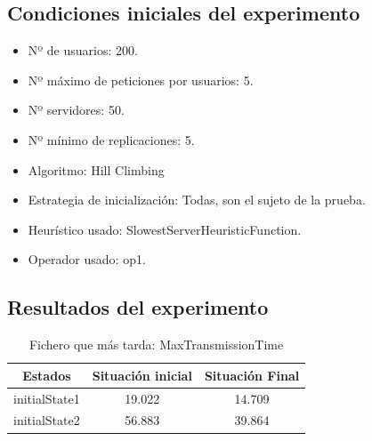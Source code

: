 \documentclass[a4paper,10pt]{report}
\begin{document}
		\subsection*{Condiciones iniciales del experimento}
		\begin{itemize}
		    \item Nº de usuarios: 200.
    		\item Nº máximo de peticiones por usuarios: 5.
    		\item Nº servidores: 50.
    		\item Nº mínimo de replicaciones: 5.
    		\item Algoritmo: Hill Climbing
    		\item Estrategia de inicialización: Todas, son el sujeto de la prueba. 
    		\item Heurístico usado: SlowestServerHeuristicFunction.
    		\item Operador usado: op1.
		\end{itemize}

		\subsection*{Resultados del experimento}
		\begin{table}[H]
		\centering
        \begin{tabular}{c|c|c}
            Estados & Situación inicial & Situación Final \\
            \hline
            \hline
            initialState1 & 19.022 & 14.709 \\
            \hline
            initialState2 & 56.883 & 39.864 \\
        \end{tabular}
        \caption*{Fichero que más tarda: MaxTransmissionTime}
        \end{table}
        
\end{document}

